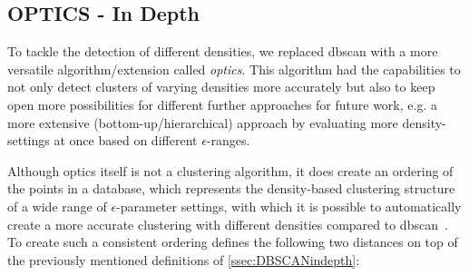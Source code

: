 \subsection{OPTICS - In Depth}\label{ssec:OPTICSindepth} %
To tackle the detection of different densities, we replaced \gls{dbscan} with a more versatile algorithm/extension called \textit{\acrfull{optics}}. This algorithm had the capabilities to not only detect clusters of varying densities more accurately but also to keep open more possibilities for different further approaches for future work, e.g. a more extensive (bottom-up/hierarchical) approach by evaluating more density-settings at once based on different $\epsilon$-ranges.

Although \gls{optics} itself is not a clustering algorithm, it does create an ordering of the points in a database, which represents the density-based clustering structure of a wide range of $\epsilon$-parameter settings, with which it is possible to automatically create a more accurate clustering with different densities compared to \gls{dbscan}~\cite{opticsankerst1999optics}. To create such a consistent ordering  \citeauthor{opticsankerst1999optics} defines the following two distances on top of the previously mentioned definitions of \autoref{ssec:DBSCANindepth}:
\vspace{5mm}

